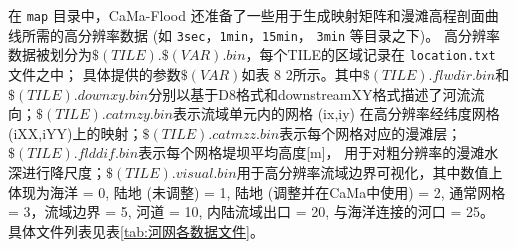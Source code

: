 在 \texttt{map} 目录中，CaMa-Flood 还准备了一些用于生成映射矩阵和漫滩高程剖面曲线所需的高分辨率数据 (如 \texttt{3sec}，\texttt{1min}，\texttt{15min}，
\texttt{3min} 等目录之下)。
高分辨率数据被划分为$\$(TILE).\$(VAR).bin$，每个TILE的区域记录在 \texttt{location.txt} 文件之中；
具体提供的参数$\$(VAR)$如表 8 2所示。其中$\$(TILE).flwdir.bin$和
$\$(TILE).downxy.bin$分别以基于D8格式和downstreamXY格式描述了河流流向；$\$(TILE).catmzy.bin$表示流域单元内的网格 (ix,iy) 
在高分辨率经纬度网格(iXX,iYY)上的映射；$\$(TILE).catmzz.bin$表示每个网格对应的漫滩层；$\$(TILE).flddif.bin$表示每个网格堤坝平均高度[m]，
用于对粗分辨率的漫滩水深进行降尺度；$\$(TILE).visual.bin$用于高分辨率流域边界可视化，其中数值上体现为海洋 = 0, 
陆地 (未调整) = 1, 陆地 (调整并在CaMa中使用) = 2, 通常网格 = 3，流域边界 = 5, 河道 = 10, 内陆流域出口 = 20, 与海洋连接的河口 = 25。
具体文件列表见表\ref{tab:河网各数据文件}。

